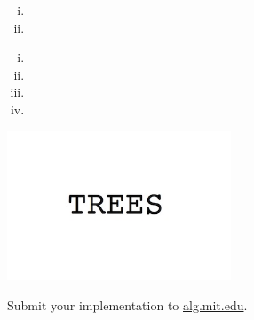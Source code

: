 \documentclass[12pt,twoside]{article}
\begin{document}


\begin{problems}

\problem  %

\begin{problemparts}
\problempart %
\problempart %
\problempart %
\problempart %
\end{problemparts}

\newpage
\problem  %

\begin{problemparts}
\problempart %
\begin{enumerate}[i.]
  \item %
  \item %
\end{enumerate}

\problempart %
\begin{enumerate}[i.]
  \item %
  \item %
  \item %
  \item %
\end{enumerate}
\begin{center}
  \includegraphics[width=0.5\textwidth]{img.jpg}
\end{center}
\end{problemparts}

\newpage
\problem  %

\begin{problemparts}
\problempart %
\problempart %
\problempart %
\problempart Submit your implementation to {\small\url{alg.mit.edu}}.
\end{problemparts}

\end{problems}
\end{document}
